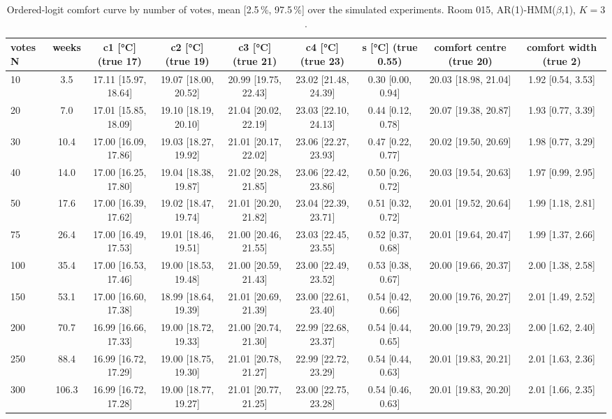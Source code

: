 \begin{table}[ht]
\centering
\begin{adjustbox}{max width=\textwidth}
\begin{tabular}{lcccccccc}
\hline
votes N & weeks & c1 [°C] (true 17) & c2 [°C] (true 19) & c3 [°C] (true 21) & c4 [°C] (true 23) & s [°C] (true 0.55) & comfort centre (true 20) & comfort width (true 2) \\
\hline
10 & 3.5 & 17.11 [15.97, 18.64] & 19.07 [18.00, 20.52] & 20.99 [19.75, 22.43] & 23.02 [21.48, 24.39] & 0.30 [0.00, 0.94] & 20.03 [18.98, 21.04] & 1.92 [0.54, 3.53] \\
20 & 7.0 & 17.01 [15.85, 18.09] & 19.10 [18.19, 20.10] & 21.04 [20.02, 22.19] & 23.03 [22.10, 24.13] & 0.44 [0.12, 0.78] & 20.07 [19.38, 20.87] & 1.93 [0.77, 3.39] \\
30 & 10.4 & 17.00 [16.09, 17.86] & 19.03 [18.27, 19.92] & 21.01 [20.17, 22.02] & 23.06 [22.27, 23.93] & 0.47 [0.22, 0.77] & 20.02 [19.50, 20.69] & 1.98 [0.77, 3.29] \\
40 & 14.0 & 17.00 [16.25, 17.80] & 19.04 [18.38, 19.87] & 21.02 [20.28, 21.85] & 23.06 [22.42, 23.86] & 0.50 [0.26, 0.72] & 20.03 [19.54, 20.63] & 1.97 [0.99, 2.95] \\
50 & 17.6 & 17.00 [16.39, 17.62] & 19.02 [18.47, 19.74] & 21.01 [20.20, 21.82] & 23.04 [22.39, 23.71] & 0.51 [0.32, 0.72] & 20.01 [19.52, 20.64] & 1.99 [1.18, 2.81] \\
75 & 26.4 & 17.00 [16.49, 17.53] & 19.01 [18.46, 19.51] & 21.00 [20.46, 21.55] & 23.03 [22.45, 23.55] & 0.52 [0.37, 0.68] & 20.01 [19.64, 20.47] & 1.99 [1.37, 2.66] \\
100 & 35.4 & 17.00 [16.53, 17.46] & 19.00 [18.53, 19.48] & 21.00 [20.59, 21.43] & 23.00 [22.49, 23.52] & 0.53 [0.38, 0.67] & 20.00 [19.66, 20.37] & 2.00 [1.38, 2.58] \\
150 & 53.1 & 17.00 [16.60, 17.38] & 18.99 [18.64, 19.39] & 21.01 [20.69, 21.39] & 23.00 [22.61, 23.40] & 0.54 [0.42, 0.66] & 20.00 [19.76, 20.27] & 2.01 [1.49, 2.52] \\
200 & 70.7 & 16.99 [16.66, 17.33] & 19.00 [18.72, 19.33] & 21.00 [20.74, 21.30] & 22.99 [22.68, 23.37] & 0.54 [0.44, 0.65] & 20.00 [19.79, 20.23] & 2.00 [1.62, 2.40] \\
250 & 88.4 & 16.99 [16.72, 17.29] & 19.00 [18.75, 19.30] & 21.01 [20.78, 21.27] & 22.99 [22.72, 23.29] & 0.54 [0.44, 0.63] & 20.01 [19.83, 20.21] & 2.01 [1.63, 2.36] \\
300 & 106.3 & 16.99 [16.72, 17.28] & 19.00 [18.77, 19.27] & 21.01 [20.77, 21.25] & 23.00 [22.75, 23.28] & 0.54 [0.46, 0.63] & 20.01 [19.83, 20.20] & 2.01 [1.66, 2.35] \\
\hline
\end{tabular}
\end{adjustbox}
\caption{Ordered-logit comfort curve by number of votes, mean [2.5\,\%, 97.5\,\%] over the simulated experiments. Room 015, AR(1)-HMM($\beta$,1), $K=3$.}
\label{tab:feedback_comfort_room_015_ar1_hmm_beta_1_K3}
\end{table}
